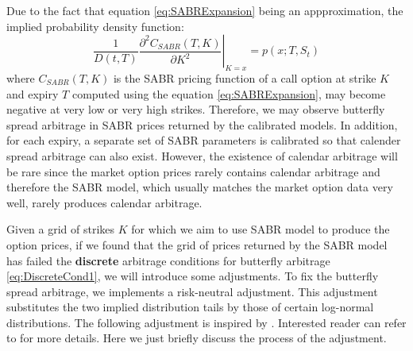 \documentclass[letterpaper,12pt,titlepage,oneside,final]{book}
\numberwithin{equation}{section}
\theoremstyle{definition}
\begin{document}
Due to the fact that equation \eqref{eq:SABRExpansion} being an appproximation, the implied probability density function:
\begin{equation}
	\frac{1}{D(t,T)} \left. \frac{\partial^2 C_{SABR}(T,K)}{\partial K^2} \right\vert_{K=x}=	p(x;T,S_t) 
	\label{eq:impliedDensity}
\end{equation}
where $C_{SABR}(T,K)$ is the SABR pricing function of a call option at strike $K$ and expiry $T$ computed using the equation \eqref{eq:SABRExpansion}, may become negative at very low or very high strikes. Therefore, we may observe butterfly spread arbitrage in SABR prices returned by the calibrated models. In addition, for each expiry, a separate set of SABR parameters is calibrated so that calender spread arbitrage can also exist. However, the existence of calendar arbitrage will be rare since the market option prices rarely contains calendar arbitrage and therefore the SABR model, which usually matches the  market option data very well, rarely produces calendar arbitrage.


Given a grid of strikes $K$ for which we aim to use SABR model to produce the option prices, if we found that the grid of prices returned by the SABR model has failed the  \textbf{discrete} arbitrage conditions for butterfly arbitrage \eqref{eq:DiscreteCond1}, we will introduce some adjustments. To fix the butterfly spread  arbitrage, we implements a risk-neutral adjustment. This adjustment substitutes the two implied distribution tails by those of certain log-normal distributions. The following  adjustment is inspired by \cite{brunner2003arbitrage}. Interested reader can refer to \cite{brunner2003arbitrage} for more details. Here we just briefly discuss the process of the adjustment.
\end{document}
